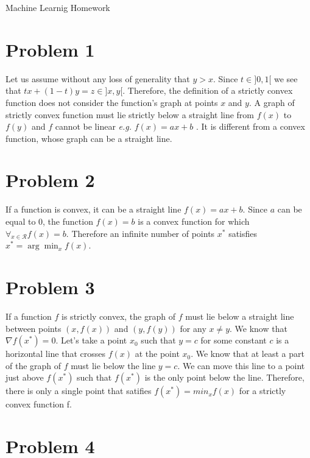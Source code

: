 \documentclass[12pt]{article}
\begin{document}
\begin{center}
{\Large Machine Learnig Homework } \\[.3in]
\end{center}
\vspace*{.5in}


\section*{Problem 1}

Let us assume without any loss of generality that $y > x$. Since $t \in ]0, 1[$ we see that $tx + (1-t)y = z \in ]x, y[$. Therefore, the definition of a strictly convex function does not consider the function's graph at points $x$ and $y$. A graph of strictly convex function must lie strictly below a straight line from $f(x)$ to $f(y)$ and $f$ cannot be linear \emph{e.g.} $f(x) = ax + b$ . It is different from a convex function, whose graph can be a straight line.

\section*{Problem 2}

If a function is convex, it can be a straight line $f(x) = ax + b$. Since $a$ can be equal to $0$, the function $f(x) = b$ is a convex function for which $\forall_{x \in \mathcal{R}} f(x) = b$. Therefore an infinite number of points $x^*$ satisfies $x^* = \arg \min_x f(x)$.

\section*{Problem 3}

If a function $f$ is strictly convex, the graph of $f$ must lie below a straight line between points $(x, f(x))$ and $(y, f(y))$ for any $x \neq y$. We know that $\nabla f(x^*) = 0$. Let's take a point $x_0$ such that $y = c$ for some constant $c$ is a horizontal line that crosses $f(x)$ at the point $x_0$. We know that at least a part of the graph of $f$ must lie below the line $y = c$. We can move this line to a point just above $f(x^*)$ such that $f(x^*)$ is the only point below the line. Therefore, there is only a single point that satifies $f(x^*) = min_x f(x)$ for a strictly convex function f.

\section*{Problem 4}
\end{document}
